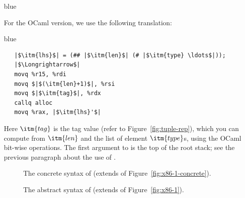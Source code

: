 \documentclass[11pt]{book}
\newcommand{\gray}[1]{{\color{gray} #1}}
\newenvironment{ocamlx}{
  \begin{color}{blue}
}
{
  \end{color}
}
\begin{document}
\begin{ocamlx}
  For the OCaml version, we use the following translation:
  
\begin{color}{blue}
\begin{lstlisting}
   |$\itm{lhs}$| = (## |$\itm{len}$| (# |$\itm{type} \ldots$|));
   |$\Longrightarrow$|
   movq %r15, %rdi
   movq $|$(\itm{len}+1)$|, %rsi
   movq $|$\itm{tag}$|, %rdx
   callq alloc
   movq %rax, |$\itm{lhs}'$|
\end{lstlisting}
\end{color}

Here $\itm{tag}$ is the tag value (refer to Figure~\ref{fig:tuple-rep}), which you can compute from $\itm{len}$ and
the list of element $\itm{type}$s, using the OCaml  bit-wise operations. The first argument to 
is the top of the root stack; see the previous paragraph about the use of .
\end{ocamlx}


\begin{figure}[tp]
\fbox{
\begin{minipage}{0.96\textwidth}
\[
\begin{array}{lcl}
  \Arg &::=& \gray{ \key{\$}\Int \mid \key{\%}\Reg \mid \Int\key{(}\key{\%}\Reg\key{)} \mid \key{\%}\itm{bytereg} } \mid \Var \key{(\%rip)} \\
\LangXGlobal{} &::= & \gray{ \key{.globl main} }\\
      &    & \gray{ \key{main:} \; \Instr\ldots }
\end{array}
\]
\end{minipage}
}
\caption{The concrete syntax of \LangXGlobal{}  (extends \LangXIf{} of Figure~\ref{fig:x86-1-concrete}).}
\label{fig:x86-2-concrete}
\end{figure}

\begin{figure}[tp]
\fbox{
  \begin{minipage}{0.96\textwidth}
    \small
\[
\begin{array}{lcl}
  \Arg &::=&  \gray{  \INT{\Int} \mid \REG{\Reg} \mid \DEREF{\Reg}{\Int}
   \mid \BYTEREG{\Reg}} \\
   &\mid& (\key{Global}~\Var) \\
\LangXGlobal{} &::= & \gray{ \XPROGRAM{\itm{info}}{\LP\LP\itm{label} \,\key{.}\, \Block \RP\ldots\RP} }
\end{array}
\]
\end{minipage}
}
\caption{The abstract syntax of \LangXGlobal{} (extends \LangXIf{} of Figure~\ref{fig:x86-1}).}
\label{fig:x86-2}
\end{figure}
\end{document}
